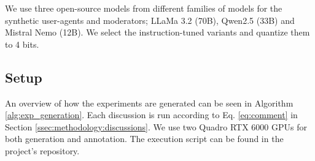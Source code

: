 We use three open-source models from different families of models for the synthetic user-agents and moderators; LLaMa 3.2 (70B), Qwen2.5 (33B) and Mistral Nemo (12B). We select the instruction-tuned variants and quantize them to 4 bits.


\subsection{Setup}

An overview of how the experiments are generated can be seen in Algorithm \ref{alg:exp_generation}. Each discussion is run according to Eq. \ref{eq:comment} in Section \ref{ssec:methodology:discussions}. We use two Quadro RTX 6000 GPUs for both generation and annotation. The execution script can be found in the project's repository\analysislink.

